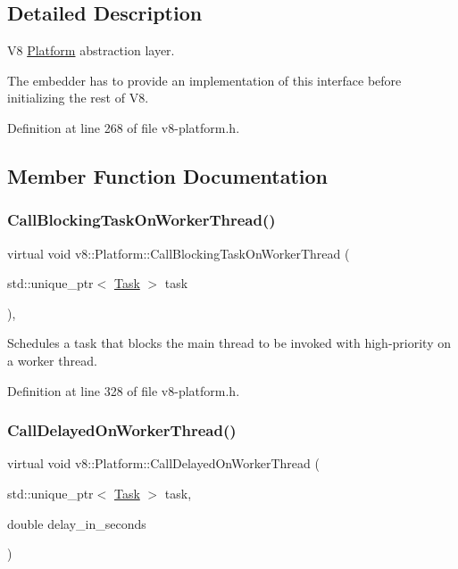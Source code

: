 \subsection{Detailed Description}
V8 \mbox{\hyperlink{classv8_1_1Platform}{Platform}} abstraction layer.

The embedder has to provide an implementation of this interface before initializing the rest of V8. 

Definition at line 268 of file v8-\/platform.\+h.



\subsection{Member Function Documentation}
\mbox{\label{classv8_1_1Platform_ada31b440048763bf8d9c296ca4cf2e1b}} 
\subsubsection{\texorpdfstring{Call\+Blocking\+Task\+On\+Worker\+Thread()}{CallBlockingTaskOnWorkerThread()}}
{\footnotesize\ttfamily virtual void v8\+::\+Platform\+::\+Call\+Blocking\+Task\+On\+Worker\+Thread (\begin{DoxyParamCaption}\item[{std\+::unique\+\_\+ptr$<$ \mbox{\hyperlink{classv8_1_1Task}{Task}} $>$}]{task }\end{DoxyParamCaption})\hspace{0.3cm}{\ttfamily [inline]}, {\ttfamily [virtual]}}

Schedules a task that blocks the main thread to be invoked with high-\/priority on a worker thread. 

Definition at line 328 of file v8-\/platform.\+h.

\mbox{\label{classv8_1_1Platform_a808b0e55ed3efca10ebca031bbd6ecc6}} 
\subsubsection{\texorpdfstring{Call\+Delayed\+On\+Worker\+Thread()}{CallDelayedOnWorkerThread()}}
{\footnotesize\ttfamily virtual void v8\+::\+Platform\+::\+Call\+Delayed\+On\+Worker\+Thread (\begin{DoxyParamCaption}\item[{std\+::unique\+\_\+ptr$<$ \mbox{\hyperlink{classv8_1_1Task}{Task}} $>$}]{task,  }\item[{double}]{delay\+\_\+in\+\_\+seconds }\end{DoxyParamCaption})\hspace{0.3cm}{\ttfamily [pure virtual]}}

